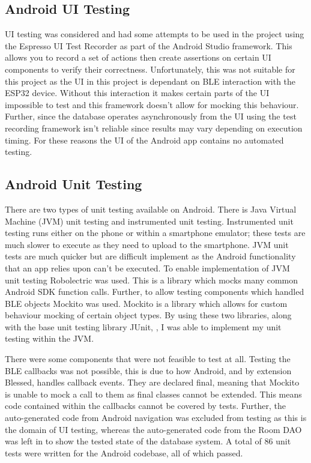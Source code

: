 \documentclass{l4proj}
\begin{document}
\subsection{Android UI Testing}

UI testing was considered and had some attempts to be used in the project using the Espresso UI Test Recorder as part of the Android Studio framework. This allows you to record a set of actions then create assertions on certain UI components to verify their correctness. Unfortunately, this was not suitable for this project as the UI in this project is dependant on BLE interaction with the ESP32 device. Without this interaction it makes certain parts of the UI impossible to test and this framework doesn't allow for mocking this behaviour. Further, since the database operates asynchronously from the UI using the test recording framework isn't reliable since results may vary depending on execution timing. For these reasons the UI of the Android app contains no automated testing.

\subsection{Android Unit Testing}

There are two types of unit testing available on Android. There is Java Virtual Machine (JVM) unit testing and instrumented unit testing. Instrumented unit testing runs either on the phone or within a smartphone emulator; these tests are much slower to execute as they need to upload to the smartphone. JVM unit tests are much quicker but are difficult implement as the Android functionality that an app relies upon can't be executed. To enable implementation of JVM unit testing Robolectric \citep{robolectric_robolectric_2019} was used. This is a library which mocks many common Android SDK function calls. Further, to allow testing components which handled BLE objects Mockito \citep{faber_mockito_2020} was used. Mockito is a library which allows for custom behaviour mocking of certain object types. By using these two libraries, along with the base unit testing library JUnit, \citep{junit_team_junit_2020}, I was able to implement my unit testing within the JVM.

There were some components that were not feasible to test at all. Testing the BLE callbacks was not possible, this is due to how Android, and by extension Blessed, handles callback events. They are declared final, meaning that Mockito is unable to mock a call to them as final classes cannot be extended. This means code contained within the callbacks cannot be covered by tests. Further, the auto-generated code from Android navigation was excluded from testing as this is the domain of UI testing, whereas the auto-generated code from the Room DAO was left in to show the tested state of the database system. A total of 86 unit tests were written for the Android codebase, all of which passed.
\end{document}

